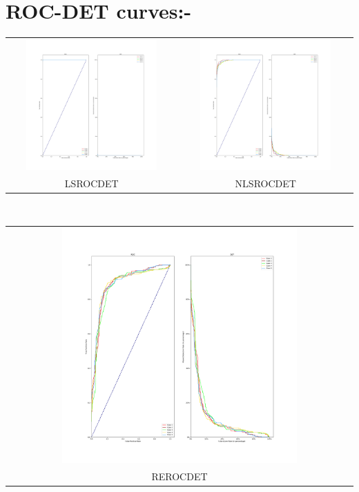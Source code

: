 \documentclass[11pt]{article}
\begin{document}
\section*{ROC-DET curves:-}
\begin{center}
  \setlength\tabcolsep{0pt}
  \begin{tabular}{cc}
  \includegraphics[height=5cm,width=10cm]{classifier/LS_plots/ROCDETPlot.png}
  & \includegraphics[height=5cm,width=10cm]{classifier/NLS_plots/ROCDETPlot.png} \\
  LSROCDET & NLSROCDET \\
  \end{tabular} \\
  \begin{tabular}{c}
  \includegraphics[height=9cm,width=18cm]{classifier/REAL_plots/ROCDETPlot.png} \\
  REROCDET \\
  \end{tabular}
\end{center}
\end{document}

